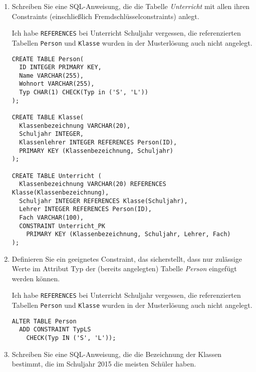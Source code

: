 \documentclass{lehramt-informatik}
\begin{document}
\begin{enumerate}


\item Schreiben Sie eine SQL-Anweisung, die die Tabelle
\emph{Unterricht} mit allen ihren Constraints (einschließlich
Fremdschlüsselconstraints) anlegt.

\begin{antwort}
Ich habe \verb|REFERENCES| bei Unterricht Schuljahr vergessen, die
referenzierten Tabellen \verb|Person| und \verb|Klasse| wurden in der
Musterlösung auch nicht angelegt.

\begin{verbatim}
CREATE TABLE Person(
  ID INTEGER PRIMARY KEY,
  Name VARCHAR(255),
  Wohnort VARCHAR(255),
  Typ CHAR(1) CHECK(Typ in ('S', 'L'))
);

CREATE TABLE Klasse(
  Klassenbezeichnung VARCHAR(20),
  Schuljahr INTEGER,
  Klassenlehrer INTEGER REFERENCES Person(ID),
  PRIMARY KEY (Klassenbezeichnung, Schuljahr)
);

CREATE TABLE Unterricht (
  Klassenbezeichnung VARCHAR(20) REFERENCES Klasse(Klassenbezeichnung),
  Schuljahr INTEGER REFERENCES Klasse(Schuljahr),
  Lehrer INTEGER REFERENCES Person(ID),
  Fach VARCHAR(100),
  CONSTRAINT Unterricht_PK
    PRIMARY KEY (Klassenbezeichnung, Schuljahr, Lehrer, Fach)
);
\end{verbatim}
\end{antwort}


\item Definieren Sie ein geeignetes Constraint, das sicherstellt, dass
nur zulässige Werte im Attribut Typ der (bereits angelegten) Tabelle
\emph{Person} eingefügt werden können.

\begin{antwort}
Ich habe \verb|REFERENCES| bei Unterricht Schuljahr vergessen, die
referenzierten Tabellen \verb|Person| und \verb|Klasse| wurden in der
Musterlösung auch nicht angelegt.

\begin{verbatim}
ALTER TABLE Person
  ADD CONSTRAINT TypLS
    CHECK(Typ IN ('S', 'L'));
\end{verbatim}
\end{antwort}


\item Schreiben Sie eine SQL-Anweisung, die die Bezeichnung der Klassen
bestimmt, die im Schuljahr 2015 die meisten Schüler haben.


\end{enumerate}
\end{document}
